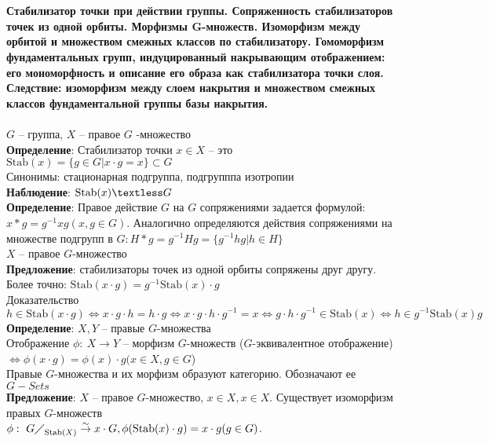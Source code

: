 \section{}
	\textbf{Стабилизатор точки при действии группы. Сопряженность стабилизаторов точек из одной орбиты. Морфизмы G-множеств. Изоморфизм между орбитой и множеством смежных классов по стабилизатору. Гомоморфизм фундаментальных групп, индуцированный накрывающим отображением: его мономорфность и описание его образа как стабилизатора точки слоя. Следствие: изоморфизм между слоем накрытия и множеством смежных классов фундаментальной группы базы накрытия.}\\
	\\
	$G$ -- группа, $X$ -- правое $G$ -множество\\
	\textbf{Определение}: Стабилизатор точки $x\in X$ -- это $\text{Stab}(x) = \{g\in G| x\cdot g = x\} \subset G$\\
	Синонимы: стационарная подгруппа, подгрупппа изотропии\\
	\textbf{Наблюдение}: $\text{Stab}(x) \textless G$\\
	\textbf{Определение}: Правое действие $G$ на $G$ сопряжениями задается формулой: $x\ast g = g^{-1} xg (x,g\in G)$. Аналогично определяются действия сопряжениями на множестве подгрупп в $G: H\ast g = g^{-1} Hg = \{g^{-1} hg|h\in H\}$\\
	$X$ -- правое $G$-множество\\
	\textbf{Предложение}: стабилизаторы точек из одной орбиты сопряжены друг другу.\\
	Более точно: $\text{Stab}(x\cdot g) = g^{-1} \text{Stab}(x) \cdot g$\\
	Доказательство $h\in \text{Stab}(x\cdot g) \Leftrightarrow x\cdot g\cdot h = h\cdot g \Leftrightarrow x\cdot g\cdot h\cdot g^{-1} = x \Leftrightarrow g\cdot h\cdot g^{-1} \in \text{Stab}(x) \Leftrightarrow h\in g^{-1} \text{Stab}(x) g$\\
	\textbf{Определение}: $X, Y$ -- правые $G$-множества\\
	Отображение $\phi:\ X\rightarrow Y$ -- морфизм $G$-множеств ($G$-эквивалентное отображение) $\Leftrightarrow \phi (x\cdot g) = \phi (x) \cdot g (x\in X, g\in G$)\\
	Правые $G$-множества и их морфизм образуют категорию. Обозначают ее $G-Sets$\\
	\textbf{Предложение}: $X$ -- правое $G$-множество, $x\in X, x\in X$. Существует изоморфизм правых $G$-множеств\\
	$\phi:\ {G\diagup}_{\text{Stab}(X)} \overset{\sim}{\rightarrow} x\cdot G, \phi(\text{Stab}(x)\cdot g) = x\cdot g (g\in G)$.\\
